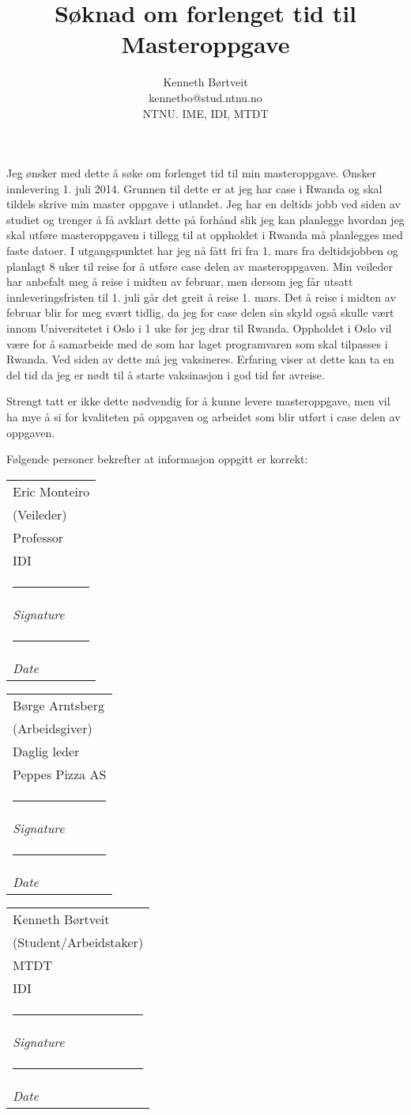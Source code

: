 \documentclass[a4paper, 11pt]{article}
\title{Søknad om forlenget tid til Masteroppgave}
\author{Kenneth Børtveit \\ kennetbo@stud.ntnu.no \\ NTNU. IME, IDI, MTDT}
\makeatletter
\newcommand{\namesigdate}[2][5cm]{%
  \begin{tabular}{@{}p{#1}@{}}
    #2 \\[2\normalbaselineskip] \hrule \\[0pt]
    {\small \textit{Signature}} \\[2\normalbaselineskip] \hrule \\[0pt]
    {\small \textit{Date}}
  \end{tabular}
}
\makeatother
\begin{document}
\maketitle
Jeg ønsker med dette å søke om forlenget tid til min masteroppgave. Ønsker innlevering 1. juli 2014.
Grunnen til dette er at jeg har case i Rwanda og skal tildels skrive min master oppgave i utlandet.
Jeg har en deltids jobb ved siden av studiet og trenger å få avklart dette på forhånd slik jeg kan planlegge hvordan jeg skal utføre masteroppgaven i tillegg til at oppholdet i Rwanda må planlegges med faste datoer.
I utgangspunktet har jeg nå fått fri fra 1. mars fra deltidsjobben og planlagt 8 uker til reise for å utføre case delen av masteroppgaven. 
Min veileder har anbefalt meg å reise i midten av februar, men dersom jeg får utsatt innleveringsfristen til 1. juli går det greit å reise 1. mars.
Det å reise i midten av februar blir for meg svært tidlig, da jeg for case delen sin skyld også skulle vært innom Universitetet i Oslo i 1 uke før jeg drar til Rwanda.
Oppholdet i Oslo vil være for å samarbeide med de som har laget programvaren som skal tilpasses i Rwanda. Ved siden av dette må jeg vaksineres. Erfaring viser at dette kan ta en del tid da jeg er nødt til å starte vaksinasjon i god tid før avreise.

Strengt tatt er ikke dette nødvendig for å kunne levere masteroppgave, men vil ha mye å si for kvaliteten på oppgaven og arbeidet som blir utført i case delen av oppgaven.

Følgende personer bekrefter at informasjon oppgitt er korrekt: \\


\noindent \namesigdate[4cm]{Eric Monteiro \\ (Veileder) \\ Professor \\ IDI} \namesigdate[4cm]{Børge Arntsberg \\ (Arbeidsgiver) \\ Daglig leder \\ Peppes Pizza AS} \namesigdate[4cm]{Kenneth Børtveit \\ (Student/Arbeidstaker) \\ MTDT \\ IDI}
\end{document}
